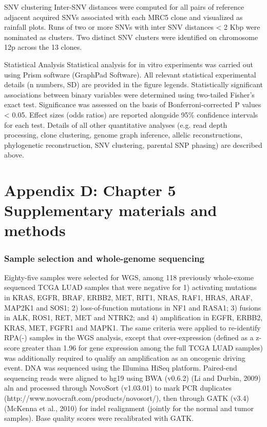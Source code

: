 \documentclass[phd,tocprelim]{cornell}
\begin{document}
SNV clustering
Inter-SNV distances were computed for all pairs of reference adjacent acquired SNVs associated with each MRC5 clone and visualized as rainfall plots. Runs of two or more SNVs with inter SNV distances < 2 Kbp were nominated as clusters. Two distinct SNV clusters were identified on chromosome 12p across the 13 clones.  

Statistical Analysis
Statistical analysis for in vitro experiments was carried out using Prism software (GraphPad Software). All relevant statistical experimental details (n numbers, SD) are provided in the figure legends. Statistically significant associations between binary variables were determined using two-tailed Fisher’s exact test. Significance was assessed on the basis of Bonferroni-corrected P values < 0.05. Effect sizes (odds ratios) are reported alongside 95\% confidence intervals for each test. Details of all other quantitative analyses (e.g. read depth processing, clone clustering, genome graph inference, allelic reconstructions, phylogenetic reconstruction, SNV clustering, parental SNP phasing) are described above.


\chapter*{Appendix D: Chapter 5 Supplementary materials and methods} \label{app:d}
\subsection*{Sample selection and whole-genome sequencing}
Eighty-five samples were selected for WGS, among 118 previously whole-exome sequenced TCGA LUAD samples that were negative for 1) activating mutations in KRAS, EGFR, BRAF, ERBB2, MET, RIT1, NRAS, RAF1, HRAS, ARAF, MAP2K1 and SOS1; 2) loss-of-function mutations in NF1 and RASA1; 3) fusions in ALK, ROS1, RET, MET and NTRK2; and 4) amplification in EGFR, ERBB2, KRAS, MET, FGFR1 and MAPK1. The same criteria were applied to re-identify RPA(-) samples in the WGS analysis, except that over-expression (defined as a z-score greater than 1.96 for gene expression among the full TCGA LUAD samples) was additionally required to qualify an amplification as an oncogenic driving event.
DNA was sequenced using the Illumina HiSeq platform. Paired-end sequencing reads were aligned to hg19 using BWA (v0.6.2) (Li and Durbin, 2009) aln and processed through NovoSort (v1.03.01) to mark PCR duplicates (http://www.novocraft.com/products/novosort/), then through GATK (v3.4) (McKenna et al., 2010) for indel realignment (jointly for the normal and tumor samples). Base quality scores were recalibrated with GATK.
\end{document}
